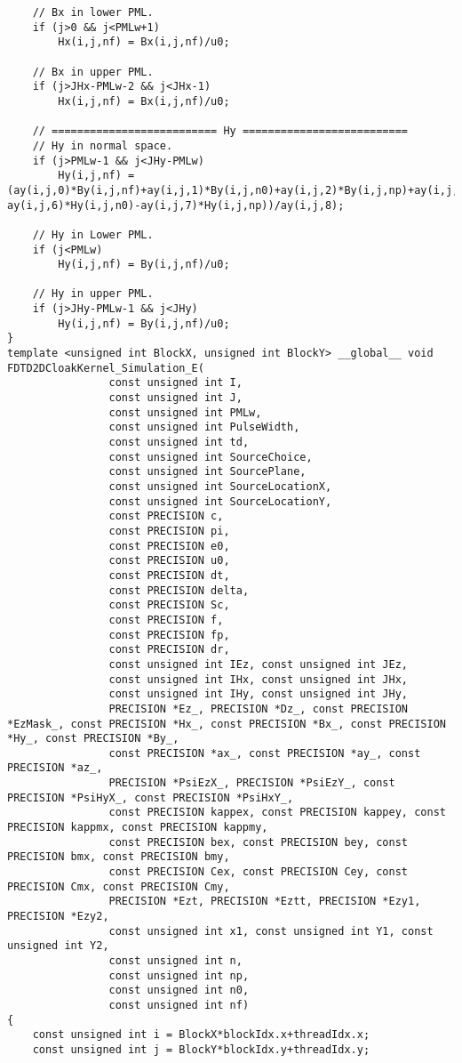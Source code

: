 \begin{lstlisting}
	// Bx in lower PML.
	if (j>0 && j<PMLw+1)
		Hx(i,j,nf) = Bx(i,j,nf)/u0;

	// Bx in upper PML.
	if (j>JHx-PMLw-2 && j<JHx-1)
		Hx(i,j,nf) = Bx(i,j,nf)/u0;

	// ========================== Hy ==========================
	// Hy in normal space.
	if (j>PMLw-1 && j<JHy-PMLw)
		Hy(i,j,nf) = (ay(i,j,0)*By(i,j,nf)+ay(i,j,1)*By(i,j,n0)+ay(i,j,2)*By(i,j,np)+ay(i,j,3)*BxAve(i,j,nf)+ay(i,j,4)*BxAve(i,j,n0)+ay(i,j,5)*BxAve(i,j,np)-ay(i,j,6)*Hy(i,j,n0)-ay(i,j,7)*Hy(i,j,np))/ay(i,j,8);

	// Hy in Lower PML.
	if (j<PMLw)
		Hy(i,j,nf) = By(i,j,nf)/u0;

	// Hy in upper PML.
	if (j>JHy-PMLw-1 && j<JHy)
		Hy(i,j,nf) = By(i,j,nf)/u0;
}
template <unsigned int BlockX, unsigned int BlockY> __global__ void FDTD2DCloakKernel_Simulation_E(
				const unsigned int I,
				const unsigned int J,
				const unsigned int PMLw,
				const unsigned int PulseWidth,
				const unsigned int td,
				const unsigned int SourceChoice,
				const unsigned int SourcePlane,
				const unsigned int SourceLocationX,
				const unsigned int SourceLocationY,
				const PRECISION c,
				const PRECISION pi,
				const PRECISION e0,
				const PRECISION u0,
				const PRECISION dt,
				const PRECISION delta,
				const PRECISION Sc,
				const PRECISION f,
				const PRECISION fp,
				const PRECISION dr,
				const unsigned int IEz, const unsigned int JEz,
				const unsigned int IHx, const unsigned int JHx,
				const unsigned int IHy, const unsigned int JHy,
				PRECISION *Ez_, PRECISION *Dz_, const PRECISION *EzMask_, const PRECISION *Hx_, const PRECISION *Bx_, const PRECISION *Hy_, const PRECISION *By_,
				const PRECISION *ax_, const PRECISION *ay_, const PRECISION *az_,
				PRECISION *PsiEzX_, PRECISION *PsiEzY_, const PRECISION *PsiHyX_, const PRECISION *PsiHxY_,
				const PRECISION kappex, const PRECISION kappey, const PRECISION kappmx, const PRECISION kappmy,
				const PRECISION bex, const PRECISION bey, const PRECISION bmx, const PRECISION bmy,
				const PRECISION Cex, const PRECISION Cey, const PRECISION Cmx, const PRECISION Cmy,
				PRECISION *Ezt, PRECISION *Eztt, PRECISION *Ezy1, PRECISION *Ezy2,
				const unsigned int x1, const unsigned int Y1, const unsigned int Y2,
				const unsigned int n,
				const unsigned int np,
				const unsigned int n0,
				const unsigned int nf)
{
	const unsigned int i = BlockX*blockIdx.x+threadIdx.x;
	const unsigned int j = BlockY*blockIdx.y+threadIdx.y;


\end{lstlisting}
